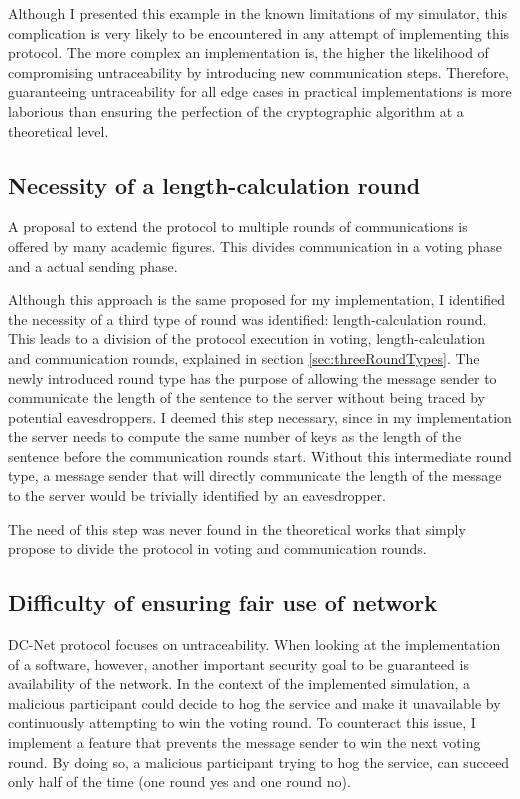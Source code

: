 Although I presented this example in the known limitations of my simulator, this complication is very likely to be encountered in any attempt of implementing this protocol. The more complex an implementation is, the higher the likelihood of compromising untraceability by introducing new communication steps. Therefore, guaranteeing untraceability for all edge cases in practical implementations is more laborious than ensuring the perfection of the cryptographic algorithm at a theoretical level. 


\subsection{Necessity of a length-calculation round}
A proposal to extend the protocol to multiple rounds of communications is offered by many academic figures. This divides communication in a voting phase and a actual sending phase.

Although this approach is the same proposed for my implementation, I identified the necessity of a third type of round was identified: length-calculation round. This leads to a division of the protocol execution in voting, length-calculation and communication rounds, explained in section \ref{sec:threeRoundTypes}. 
The newly introduced round type has the purpose of allowing the message sender to communicate the length of the sentence to the server without being traced by potential eavesdroppers. I deemed this step necessary, since in my implementation the server needs to compute the same number of keys as the length of the sentence before the communication rounds start. Without this intermediate round type, a message sender that will directly communicate the length of the message to the server would be trivially identified by an eavesdropper.

The need of this step was never found in the theoretical works that simply propose to divide the protocol in voting and communication rounds.


\subsection{Difficulty of ensuring fair use of network}
DC-Net protocol focuses on untraceability. When looking at the implementation of a software, however, another important security goal to be guaranteed is availability of the network. In the context of the implemented simulation, a malicious participant could decide to hog the service and make it unavailable by continuously attempting to win the voting round. To counteract this issue, I implement a feature that prevents the message sender to win the next voting round. By doing so, a malicious participant trying to hog the service, can succeed only half of the time (one round yes and one round no).

